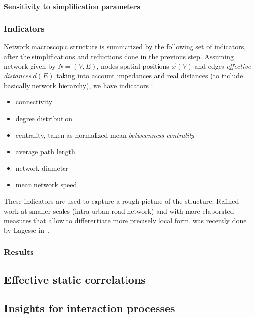 \paragraph{Sensitivity to simplification parameters}



\subsubsection{Indicators}

Network macroscopic structure is summarized by the following set of indicators, after the simplifications and reductions done in the previous step. Assuming network given by $N=(V,E)$, nodes spatial positions $\vec{x}(V)$ and edges \emph{effective distances} $d(E)$ taking into account impedances and real distances (to include basically network hierarchy), we have indicators :
\begin{itemize}
\item connectivity
\item degree distribution
\item centrality, taken as normalized mean \emph{betweenness-centrality}
\item average path length
\item network diameter
\item mean network speed
\end{itemize}

These indicators are used to capture a rough picture of the structure. Refined work at smaller scales (intra-urban road network) and with more elaborated measures that allow to differentiate more precisely local form, was recently done by Lagesse in~\cite{2015arXiv151201268L}.



\subsubsection{Results}




\subsection{Effective static correlations}



\subsection{Insights for interaction processes}







